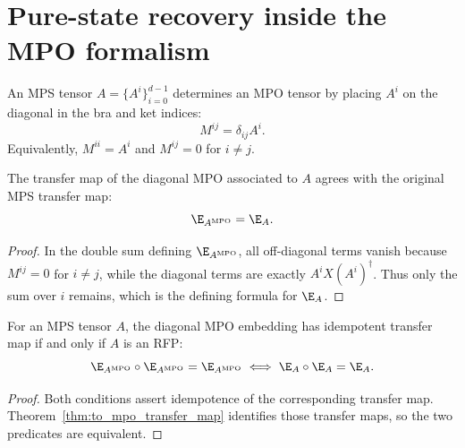 \section{Pure-state recovery inside the MPO formalism}

\begin{definition}\label{def:to_mpo_tensor}
    \leanok
    An MPS tensor $A = \{A^i\}_{i=0}^{d-1}$ determines an MPO tensor by
    placing $A^i$ on the diagonal in the bra and ket indices:
    \[
        M^{ij} = \delta_{ij} A^i.
    \]
    Equivalently, $M^{ii} = A^i$ and $M^{ij} = 0$ for $i \ne j$.
\end{definition}

\begin{theorem}%
    \label{thm:to_mpo_transfer_map}
    \leanok
    The transfer map of the diagonal MPO associated to $A$ agrees with the
    original MPS transfer map:
    \[
        \E_{A^{\mathrm{MPO}}} = \E_A.
    \]
\end{theorem}

\begin{proof}
    \leanok
    In the double sum defining $\E_{A^{\mathrm{MPO}}}$, all off-diagonal terms
    vanish because $M^{ij} = 0$ for $i \ne j$, while the diagonal terms are
    exactly $A^i X (A^i)^\dagger$. Thus only the sum over $i$ remains, which
    is the defining formula for $\E_A$.
\end{proof}

\begin{theorem}%
    \label{thm:to_mpo_rfp_iff_rfp}
    \leanok
    For an MPS tensor $A$, the diagonal MPO embedding has idempotent transfer
    map if and only if $A$ is an RFP:
    \[
        \E_{A^{\mathrm{MPO}}}\circ\E_{A^{\mathrm{MPO}}}
        = \E_{A^{\mathrm{MPO}}}
        \iff
        \E_A\circ\E_A=\E_A.
    \]
\end{theorem}

\begin{proof}
    \leanok
    Both conditions assert idempotence of the corresponding transfer map.
    Theorem~\ref{thm:to_mpo_transfer_map} identifies those transfer maps, so
    the two predicates are equivalent.
\end{proof}

